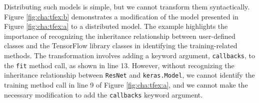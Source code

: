 
Distributing such models is simple, but we cannot transform them syntactically.
Figure \ref{fig:cha:tfex:b} demonstrates a modification of the model presented
in Figure \ref{fig:cha:tfex:a} to a distributed model. 
The example highlights the importance of recognizing the inheritance
relationship between user-defined classes and the TensorFlow library classes in
identifying the training-related methods. 
The transformation involves adding a keyword argument, {\tt callbacks}, to the
{\tt fit} method call, as shown in line 13.
However, without recognizing the inheritance relationship between {\tt ResNet}
and {\tt keras.Model}, we cannot identify the training method call in line
9 of Figure \ref{fig:cha:tfex:a}, and we cannot make the necessary modification
to add the {\tt callbacks} keyword argument.


